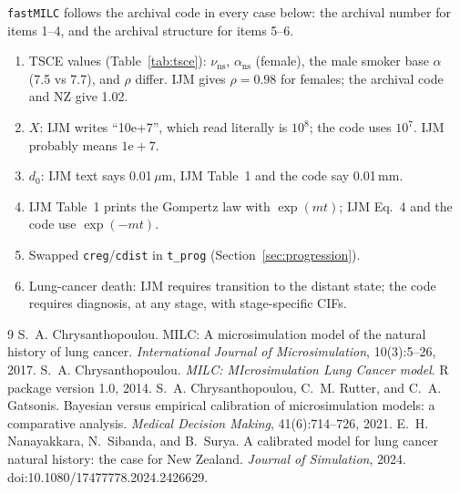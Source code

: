 \documentclass[11pt]{article}
\newcommand{\code}[1]{\texttt{#1}}
\newcommand{\ns}{\mathrm{ns}}
\begin{document}
\code{fastMILC} follows the archival code in every case below: the archival
number for items 1--4, and the archival structure for items 5--6.

\begin{enumerate}[nosep]
\item TSCE values (Table~\ref{tab:tsce}): $\nu_\ns$, $\alpha_\ns$ (female),
  the male smoker base $\alpha$ (7.5 vs 7.7), and $\rho$ differ. IJM gives
  $\rho = 0.98$ for females; the archival code and NZ give 1.02.
\item $X$: IJM writes ``10e+7'', which read literally is $10^8$; the code uses
  $10^7$. IJM probably means $1\mathrm{e}{+}7$.
\item $d_0$: IJM text says 0.01\,$\mu$m, IJM Table~1 and the code say 0.01\,mm.
\item IJM Table~1 prints the Gompertz law with $\exp(mt)$; IJM Eq.~4 and the code
  use $\exp(-mt)$.
\item Swapped \code{creg}/\code{cdist} in \code{t\_prog} (Section~\ref{sec:progression}).
\item Lung-cancer death: IJM requires transition to the distant state; the code
  requires diagnosis, at any stage, with stage-specific CIFs.
\end{enumerate}

\begin{thebibliography}{9}
 S.~A. Chrysanthopoulou. MILC: A microsimulation model of the
natural history of lung cancer. \emph{International Journal of Microsimulation},
10(3):5--26, 2017.
 S.~A. Chrysanthopoulou. \emph{MILC: MIcrosimulation Lung Cancer
model}. R package version 1.0, 2014.
 S.~A. Chrysanthopoulou, C.~M. Rutter, and C.~A. Gatsonis.
Bayesian versus empirical calibration of microsimulation models: a comparative
analysis. \emph{Medical Decision Making}, 41(6):714--726, 2021.
 E.~H. Nanayakkara, N.~Sibanda, and B.~Surya. A calibrated model
for lung cancer natural history: the case for New Zealand. \emph{Journal of
Simulation}, 2024. doi:10.1080/17477778.2024.2426629.
\end{thebibliography}
\end{document}
